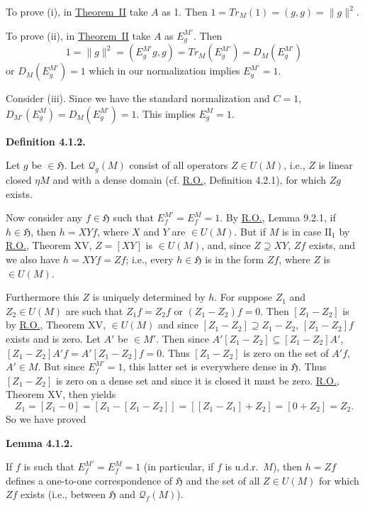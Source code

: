 \documentclass[twoside,leqno]{article}
\newcommand{\TrM}{Tr_M}
\newcommand{\cH}{\mathfrak{H}}
\newcommand{\Q}{\mathcal{Q}}
\newcommand{\RO}{\href{https://doi.org/10.2307/1968693}{R.O.}}
\newcommand{\StatementTarget}[1]{\phantomsection\hypertarget{stmt:#1}{}}
\newcommand{\StatementRef}[2]{\hyperlink{stmt:#1}{#2}}
\newenvironment{statement}[2]{%
  \par\medskip
  \noindent\StatementTarget{#1}\hspace*{\parindent}\textbf{#2.}\ \itshape\ignorespaces
}{\par}
\begin{document}
To prove (i), in \StatementRef{theorem:II}{Theorem~II} take $A$ as 1. Then
$1=\TrM(1)=(g,g)=\lVert g\rVert^2$.

To prove (ii), in \StatementRef{theorem:II}{Theorem~II} take $A$ as
$E_g^{M'}$. Then
\[
 1=\lVert g\rVert^2=(E_g^{M'}g,g)
 =\TrM(E_g^{M'})=D_M(E_g^{M'})
\]
or $D_M(E_g^{M'})=1$ which in our normalization implies $E_g^{M'}=1$.



Consider (iii). Since we have the standard normalization and \(C=1\),
$D_{M'}(E_g^M)=D_M(E_g^{M'})=1$.
This implies \(E_g^M=1\).

\begin{statement}{def:4.1.2}{Definition 4.1.2}
Let \(g\) be \(\in\cH\). Let \(\Q_g(M)\) consist of all operators \(Z\in U(M)\),
i.e., \(Z\) is linear closed \(\eta M\) and with a dense domain
(cf. \RO, Definition 4.2.1), for which \(Zg\) exists.
\end{statement}

Now consider any \(f\in\cH\) such that \(E_f^{M'}=E_f^M=1\). By \RO,
Lemma 9.2.1, if \(h\in\cH\), then \(h=XYf\), where \(X\) and \(Y\) are
\(\in U(M)\). But if \(M\) is in case \(\mathrm{II}_1\) by \RO, Theorem XV,
\(Z=[XY]\) is \(\in U(M)\), and, since \(Z\supseteq XY\), \(Zf\) exists, and
we also have \(h=XYf=Zf\); i.e., every \(h\in\cH\) is in the form \(Zf\),
where \(Z\) is \(\in U(M)\).

Furthermore this \(Z\) is uniquely determined by \(h\). For suppose \(Z_1\)
and \(Z_2\in U(M)\) are such that \(Z_1f=Z_2f\) or
\((Z_1-Z_2)f=0\). Then \([Z_1-Z_2]\) is by \RO, Theorem XV, \(\in U(M)\)
and since \([Z_1-Z_2]\supseteq Z_1-Z_2\), \([Z_1-Z_2]f\) exists and is zero.
Let \(A'\) be \(\in M'\). Then since
\(A'[Z_1-Z_2]\subseteq[Z_1-Z_2]A'\),
$[Z_1-Z_2]A'f=A'[Z_1-Z_2]f=0$.
Thus \([Z_1-Z_2]\) is zero on the set of \(A'f\), \(A'\in M\). But since
\(E_f^{M'}=1\), this latter set is everywhere dense in \(\cH\). Thus
\([Z_1-Z_2]\) is zero on a dense set and since it is closed it must be zero.
\RO, Theorem XV, then yields
\[
 Z_1=[Z_1-0]=[Z_1-[Z_1-Z_2]]
     =[[Z_1-Z_1]+Z_2]=[0+Z_2]=Z_2.
\]
So we have proved

\begin{statement}{lem:4.1.2}{Lemma 4.1.2}
If \(f\) is such that \(E_f^{M'}=E_f^M=1\) (in particular, if \(f\) is
u.d.r.\ \(M\)), then \(h=Zf\) defines a one-to-one correspondence of
\(\cH\) and the set of all \(Z\in U(M)\) for which \(Zf\) exists
(i.e., between \(\cH\) and \(\Q_f(M)\)).
\end{statement}
\end{document}
